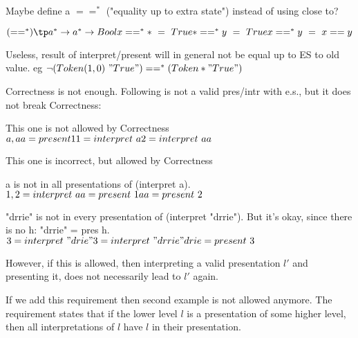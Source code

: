 
Maybe define a $==^*$ ("equality up to extra state") instead of using close to?

\begin{math}
(==^*) \tp a^* \rightarrow a^* \rightarrow Bool\\
x ==^* * ~=~ True\\
* ==^* y ~=~ True\\
x ==^* y ~=~ x == y\\
\end{math}

Useless, result of interpret/present will in general not be equal up to ES to old value. eg $\lnot (Token (1,0)~"True") ==^* (Token * "True")$


{\sc Correctness}  is not enough. Following is not a valid pres/intr with e.s., but it does not break {\sc Correctness}:

This one is not allowed by {\sc Correctness}
\begin{math}
{a,aa} = present 1\\
{1} = interpret~a\\
{2} = interpret~aa
\end{math}

This one is incorrect, but allowed by  {\sc Correctness}

a is not in all presentations of (interpret a). 
\begin{math}
{1,2} = interpret~a\\
{a} = present~1\\
{aa} = present~2\\
\end{math}

"drrie" is not in every presentation of (interpret  "drrie"). But it's okay, since there is no h: "drrie" = pres h.
\begin{math}
{3} = interpret~"drie"\\
{3} = interpret~"drrie"\\
{drie} = present~3
\end{math}

However, if this is allowed, then interpreting a valid presentation $l'$ and presenting it, does not necessarily lead to $l'$ again. 

If we add this requirement then second example is not allowed anymore. The requirement states that if the lower level $l$ is a presentation of some higher level, then all interpretations of $l$ have $l$ in their presentation.

